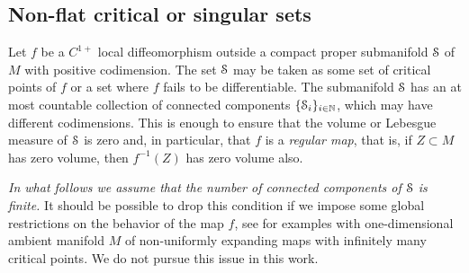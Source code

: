 \documentclass[reqno,12pt,a4paper]{amsart}
\theoremstyle{plain}
\theoremstyle{definition}
\begin{document}
\subsection{Non-flat critical or singular sets}
\label{sec:non-flat-critic}

Let $f$ be a $C^{1+}$ local diffeomorphism outside a compact
proper submanifold ${\EuScript{S}}$ of $M$ with positive codimension.
 The set ${\EuScript{S}}$ may be taken as some set of critical points
 of $f$ or a set where $f$ fails to be differentiable. The
 submanifold ${\EuScript{S}}$ has an at most countable collection of
 connected components $\{{\EuScript{S}}_i\}_{i\in{{\mathbb N}}}$, which may have
 different codimensions. This is enough to ensure that the
 volume or Lebesgue measure of ${\EuScript{S}}$ is zero and, in
 particular, that $f$ is a \emph{regular map}, that is, if
 $Z\subset M$ has zero volume, then $f^{-1}(Z)$ has zero
 volume also.

 \emph{In what follows we assume that the number of
   connected components of ${\EuScript{S}}$ is finite.} It should be
 possible to drop this condition if we impose some global
 restrictions on the behavior of the map $f$, see
 \cite{PRV98} for examples with one-dimensional ambient
 manifold $M$ of non-uniformly expanding maps with
 infinitely many critical points. We do not pursue this
 issue in this work.
\end{document}
